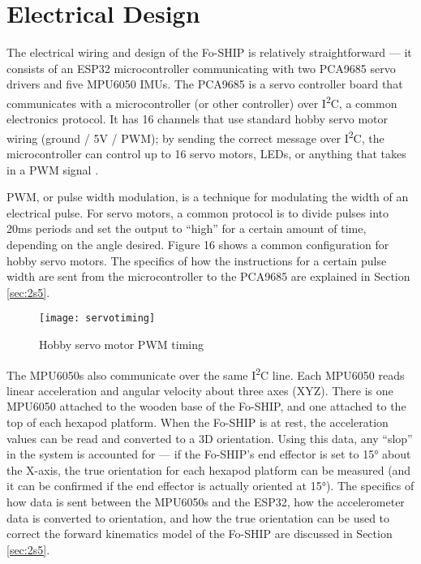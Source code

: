 \documentclass[11pt]{ucthesisCP}
\begin{document}
\vspace{10pt}
\section{Electrical Design} \label{sec:2s3}
The electrical wiring and design of the Fo-SHIP is relatively straightforward --- it consists of an ESP32 microcontroller communicating with two PCA9685 servo drivers and five MPU6050 IMUs. The PCA9685 is a servo controller board that communicates with a microcontroller (or other controller) over I\textsuperscript{2}C, a common electronics protocol. It has 16 channels that use standard hobby servo motor wiring (ground / 5V / PWM); by sending the correct message over I\textsuperscript{2}C, the microcontroller can control up to 16 servo motors, LEDs, or anything that takes in a PWM signal \cite{pca9685datasheet}.

PWM, or pulse width modulation, is a technique for modulating the width of an electrical pulse. For servo motors, a common protocol is to divide pulses into 20ms periods and set the output to “high” for a certain amount of time, depending on the angle desired. Figure 16 shows a common configuration for hobby servo motors. The specifics of how the instructions for a certain pulse width are sent from the microcontroller to the PCA9685 are explained in Section \ref{sec:2s5}.

\begin{figure}[htbp]
	\centering
	\texttt{[image: servotiming]}
	\caption{Hobby servo motor PWM timing \cite{servos}}
	\label{fig:servotiming}
\end{figure}

The MPU6050s also communicate over the same I\textsuperscript{2}C line. Each MPU6050 reads linear acceleration and angular velocity about three axes (XYZ). There is one MPU6050 attached to the wooden base of the Fo-SHIP, and one attached to the top of each hexapod platform. When the Fo-SHIP is at rest, the acceleration values can be read and converted to a 3D orientation. Using this data, any “slop” in the system is accounted for --- if the Fo-SHIP’s end effector is set to 15° about the X-axis, the true orientation for each hexapod platform can be measured (and it can be confirmed if the end effector is actually oriented at 15°). The specifics of how data is sent between the MPU6050s and the ESP32, how the accelerometer data is converted to orientation, and how the true orientation can be used to correct the forward kinematics model of the Fo-SHIP are discussed in Section \ref{sec:2s5}. 
\end{document}
